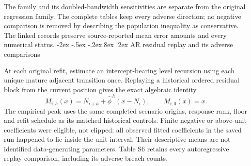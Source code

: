 \documentclass[10pt,a4paper]{article}
\makeatletter
\renewcommand\section{\@startsection{section}{1}{\z@}%
  {-2ex \@plus -.5ex \@minus -.2ex}{.8ex \@plus .2ex}%
  {\normalfont\large\bfseries}}
\makeatother
\begin{document}
The family and its doubled-bandwidth sensitivities are separate
from the original regression family. The complete tables keep every adverse
direction; no negative comparison is removed by describing the population
inequality as conservative. The linked records preserve source-reported mean
error amounts and every numerical status.\section{AR residual replay and its adverse comparisons}\label{sup:ar}

At each original refit, estimate an intercept-bearing level recursion
using each unique mature adjacent transition once. Replaying a historical ordered
residual block from the current position gives the exact algebraic identity
\[
M_{i,h}(x)=N_{i+h}+\widehat\phi^{\,h}(x-N_i),\qquad M_{i,0}(x)=x.
\]
The empirical peak uses the same completed scenario origins, response rank,
floor and refit schedule as its matched historical controls. Finite negative or
above-unit coefficients were eligible, not clipped; all observed fitted
coefficients in the saved run happened to lie inside the unit interval.
Their descriptive means are not identified data-generating parameters.
Table S6 retains every autoregressive replay comparison, including its adverse breach counts.
\begingroup
\small
\setlength{\tabcolsep}{3pt}
\renewcommand{\arraystretch}{1.12}
\end{document}
